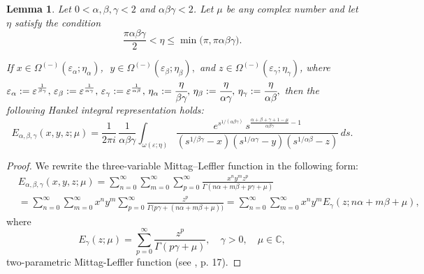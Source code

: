 \documentclass[12pt, reqno]{amsart}
\newtheorem{lemma}[theorem]{Lemma}
\theoremstyle{definition}
\theoremstyle{remark}
\numberwithin{equation}{section}
\begin{document}
\begin{lemma}\label{l3.1}
     Let $0 < \alpha, \beta,\gamma < 2$ and $\alpha\beta\gamma < 2$. Let $\mu$ be any complex number and let $\eta$ satisfy the condition
\begin{equation}\label{3.1}
\frac{\pi\alpha\beta\gamma}{2}
<
\eta
\leq
\min\!\bigl(\pi,\pi\alpha\beta\gamma\bigr).
\end{equation}

If
$
x \in \Omega^{(-)}({\varepsilon}_\alpha;\eta_\alpha)
$,\,\, 
$y \in \Omega^{(-)}({\varepsilon}_\beta;\eta_\beta),
$ and $z \in \Omega^{(-)}({\varepsilon}_\gamma;\eta_\gamma)
$,
where
$
{\varepsilon}_\alpha:={\varepsilon}^{\frac{1}{\beta\gamma}},\,
{\varepsilon}_\beta:={\varepsilon}^{\frac{1}{\alpha\gamma}}, \,{\varepsilon}_\gamma:={\varepsilon}^{\frac{1}{\alpha\beta}},\,
\eta_\alpha:=\cfrac{{\eta}}{\beta\gamma},\,
\eta_\beta:=\cfrac{{\eta}}{\alpha\gamma},\,
\eta_\gamma:=\cfrac{{\eta}}{\alpha\beta},
$
then the following Hankel integral representation holds:
\begin{equation}\label{three-variable integral representation}
E_{\alpha,\beta,\gamma}(x,y,z;\mu)
=
\frac{1}{2\pi i}\,
\frac{1}{\alpha\beta\gamma}
\int_{\omega(\varepsilon;\eta)}
\frac{
e^{s^{1/(\alpha\beta\gamma)}}
\,s^{\frac{\alpha+\beta+\gamma+1-\mu}{\alpha\beta\gamma}-1}
}
{
(s^{1/\beta\gamma}-x)(s^{1/\alpha\gamma}-y)(s^{1/\alpha\beta}-z)
}
\,ds.
\end{equation}
\end{lemma}\begin{proof}
We rewrite the three-variable Mittag--Leffler function in the following form:
\begin{equation}\label{1.1}
\begin{aligned}
&E_{\alpha,\beta,\gamma}(x,y,z;\mu)
=
\sum_{n=0}^{\infty}
\sum_{m=0}^{\infty}\sum_{p=0}^{\infty}
\frac{x^n y^m z^p}
{\Gamma(n\alpha+m\beta+p\gamma+\mu)}\\
&=
\sum_{n=0}^{\infty}
\sum_{m=0}^{\infty}x^ny^m
\sum_{p=0}^{\infty}
\frac{z^p }
{\Gamma\bigl(p\gamma+(n\alpha+m\beta+\mu)\bigr)}=
\sum_{n=0}^{\infty}
\sum_{m=0}^{\infty}x^ny^m
E_{\gamma}(z;n\alpha+m\beta+\mu),
\end{aligned}\end{equation}
 where 
 $$E_{\gamma}(z;\mu)=\sum_{p=0}^{\infty}\frac{z^p}{\Gamma(p\gamma+\mu)},\quad \gamma>0,\quad\mu\in \mathbb{C},$$
 two-parametric Mittag-Leffler function (see \cite{Podlubny}, p. 17).
 

\end{proof}
\end{document}
